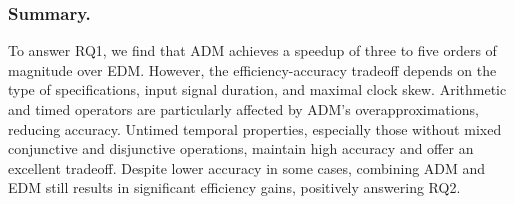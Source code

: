 \vspace{-0.5em}
\subsubsection{Summary.}
To answer RQ1, we find that ADM achieves a speedup of three to five orders of magnitude over EDM. However, the efficiency-accuracy tradeoff depends on the type of specifications, input signal duration, and maximal clock skew. Arithmetic and timed operators are particularly affected by ADM's overapproximations, reducing accuracy. Untimed temporal properties, especially those without mixed conjunctive and disjunctive operations, maintain high accuracy and offer an excellent tradeoff. Despite lower accuracy in some cases, combining ADM and EDM still results in significant efficiency gains, positively answering RQ2.

